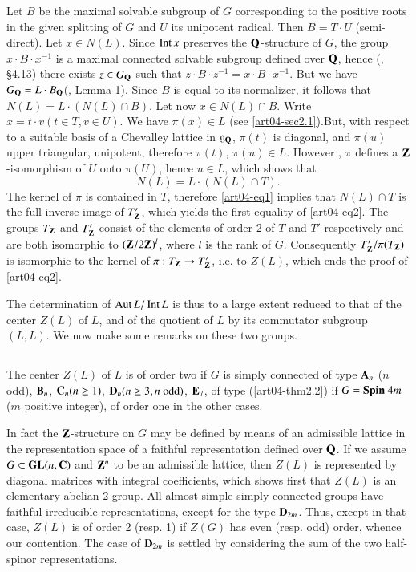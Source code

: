 Let $B$ be the maximal solvable subgroup of $G$ corresponding to the positive roots in the given splitting of $G$ and $U$ its unipotent radical. Then $B=T\cdot U$ (semi-direct). Let $x\in N(L)$. Since $\operatorname{\mathrm{Int}} x$ preserves the $\mathbf{Q}$-structure of $G$, the group $x\cdot B\cdot x^{-1}$ is a maximal connected solvable subgroup defined over $\mathbf{Q}$, hence (\cite{art04-key9}, \S4.13) there exists $z\in G_{\mathbf{Q}}$ such that $z\cdot B\cdot z^{-1}=x\cdot B\cdot x^{-1}$. But we have $G_{\mathbf{Q}}=L\cdot B_{\mathbf{Q}}$(\cite{art04-key6}, Lemma 1). Since $B$ is equal to its normalizer, it follows that $N(L)=L\cdot (N(L)\cap B)$. Let now $x\in N(L)\cap B$. Write $x=t\cdot v(t\in T,v\in U)$. We have $\pi(x)\in L$ (see \ref{art04-sec2.1}).\pageoriginale But, with respect to a suitable basis of a Chevalley lattice in $\mathfrak{g}_{\mathbf{Q}}$, $\pi(t)$ is diagonal, and $\pi(u)$ upper triangular, unipotent, therefore $\pi(t)$, $\pi(u)\in L$. However \cite{art04-key10}, $\pi$ defines a $\mathbf{Z}$-isomorphism of $U$ onto $\pi(U)$, hence $u\in L$, which shows that
\begin{equation*}
N(L)=L\cdot (N(L)\cap T).\tag{3}\label{art04-eq3}
\end{equation*}
The kernel of $\pi$ is contained in $T$, therefore \eqref{art04-eq1} implies that $N(L)\cap T$ is the full inverse image of $T'_{\mathbf{Z}}$, which yields the first equality of \eqref{art04-eq2}. The groups $T_{\mathbf{Z}}$ and $T'_{\mathbf{Z}}$ consist of the elements of order 2 of $T$ and $T'$ respectively and are both isomorphic to $(\mathbf{Z}/2\mathbf{Z})^{l}$, where $l$ is the rank of $G$. Consequently $T'_{\mathbf{Z}}/\pi(T_{\mathbf{Z}})$ is isomorphic to the kernel of $\pi:T_{\mathbf{Z}}\to T'_{\mathbf{Z}}$, i.e. to $Z(L)$, which ends the proof of \eqref{art04-eq2}.

The determination of $\operatorname{\mathrm{Aut}} L/\operatorname{\mathrm{Int}} L$ is thus to a large extent reduced to that of the center $Z(L)$ of $L$, and of the quotient of $L$ by its commutator subgroup $(L,L)$. We now make some remarks on these two groups.

\setcounter{subsection}{3}
\subsection{}\label{art04-sec2.4}
The center $Z(L)$ of $L$ is of order two if $G$ is simply connected of type $\mathbf{A}_{n}$ ($n$ odd), $\mathbf{B}_{n}$, $\mathbf{C}_{n}(n\geq 1)$, $\mathbf{D}_{n}(n\geq 3, n\text{~odd})$, $\mathbf{E}_{7}$, of type (\ref{art04-thm2.2}) if $G={\boldmath\text{$\operatorname{\mathrm{Spin}}$~}} 4m$ ($m$ positive integer), of order one in the other cases.

In fact the $\mathbf{Z}$-structure on $G$ may be defined by means of an admissible lattice in the representation space of a faithful representation defined over $\mathbf{Q}$. If we assume $G\subset \mathbf{GL}(n,\mathbf{C})$ and $\mathbf{Z}^{n}$ to be an admissible lattice, then $Z(L)$ is represented by diagonal matrices with integral coefficients, which shows first that $Z(L)$ is an elementary abelian 2-group. All almost simple simply connected groups have faithful irreducible representations, except for the type $\mathbf{D}_{2m}$. Thus, except in that case, $Z(L)$ is of order 2 (resp. 1) if $Z(G)$ has even (resp. odd) order, whence our contention. The case of $\mathbf{D}_{2m}$ is settled by considering the sum of the two half-spinor representations.

